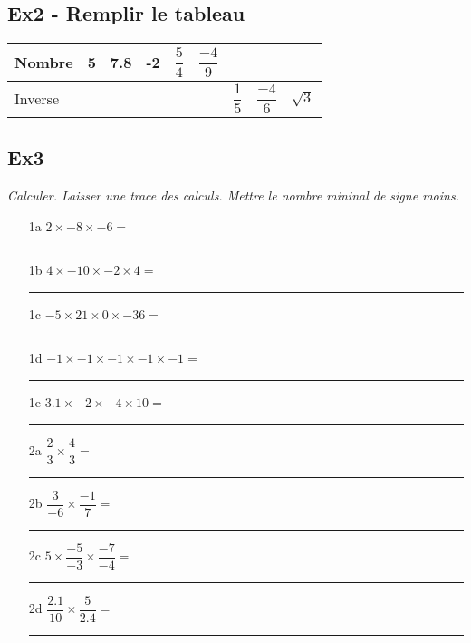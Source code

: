 \documentclass[12pt]{article}
\begin{document}

\subsection*{Ex2 - Remplir le tableau}

\begin{center}
  \begin{tabular}{| l || c | c | c | c | c | c | c | c | }
    \hline
    Nombre & 5                 & 7.8               & -2               & $\dfrac{5}{4}$   & $\dfrac{-4}{9}$  & \phantom{azerty} & \phantom{azerty} & \phantom{azerty}  \\
    \hline
    Inverse & \phantom{azerty}  & \phantom{azerty}  & \phantom{azerty} & \phantom{azerty} & \phantom{azerty} & $\dfrac{1}{5}$   & $\dfrac{-4}{6}$  & $\sqrt{3}$ \\
    \hline
  \end{tabular}
\end{center}


\subsection*{Ex3}
\textit{Calculer. Laisser une trace des calculs. Mettre le nombre mininal de signe moins.}

\begin{multicols}{2}
  
\begin{enumerate}
\item[1a] $2 \times  -8 \times -6 = $\\
  \rule{\linewidth}{0.5pt}
\item[1b] $4 \times  -10 \times -2 \times 4 = $\\
  \rule{\linewidth}{0.5pt}
\item[1c] $-5 \times 21 \times 0 \times -36 = $\\
  \rule{\linewidth}{0.5pt}
\item[1d] $-1 \times -1 \times -1 \times -1 \times -1 = $\\
  \rule{\linewidth}{0.5pt}
\item[1e] $3.1 \times -2 \times -4 \times 10 = $\\
  \rule{\linewidth}{0.5pt}   
\end{enumerate}


\begin{enumerate}
\item[2a] $ \dfrac{2}{3} \times \dfrac{4}{3} = $\\
  \rule{\linewidth}{0.5pt}
\item[2b] $ \dfrac{3}{-6} \times \dfrac{-1}{7} = $\\
  \rule{\linewidth}{0.5pt}
\item[2c] $ 5 \times \dfrac{-5}{-3} \times \dfrac{-7}{-4} = $\\
    \rule{\linewidth}{0.5pt}
\item[2d] $ \dfrac{2.1}{10} \times \dfrac{5}{2.4} = $\\
  \rule{\linewidth}{0.5pt}
\end{enumerate}

\end{multicols}
\end{document}
